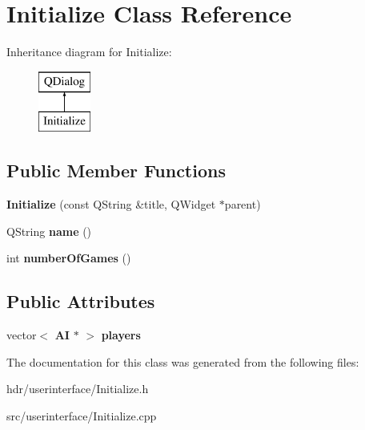 \section{Initialize Class Reference}
\label{class_initialize}
Inheritance diagram for Initialize\-:\begin{figure}[H]
\begin{center}
\leavevmode
\includegraphics[height=2.000000cm]{class_initialize}
\end{center}
\end{figure}
\subsection*{Public Member Functions}
\begin{DoxyCompactItemize}
\item 
{\bfseries Initialize} (const Q\-String \&title, Q\-Widget $\ast$parent)\label{class_initialize_ac74c7a2fe5cdf5499d0798d4e487f819}

\item 
Q\-String {\bfseries name} ()\label{class_initialize_aad22139b103dbcc5ba568eec9e68e270}

\item 
int {\bfseries number\-Of\-Games} ()\label{class_initialize_a3aa15f1e0f87b9abf1c76af3acb6bd60}

\end{DoxyCompactItemize}
\subsection*{Public Attributes}
\begin{DoxyCompactItemize}
\item 
vector$<$ {\bf A\-I} $\ast$ $>$ {\bfseries players}\label{class_initialize_abe4843ae42f98eac4eb473a7748ac031}

\end{DoxyCompactItemize}


The documentation for this class was generated from the following files\-:\begin{DoxyCompactItemize}
\item 
hdr/userinterface/Initialize.\-h\item 
src/userinterface/Initialize.\-cpp\end{DoxyCompactItemize}
